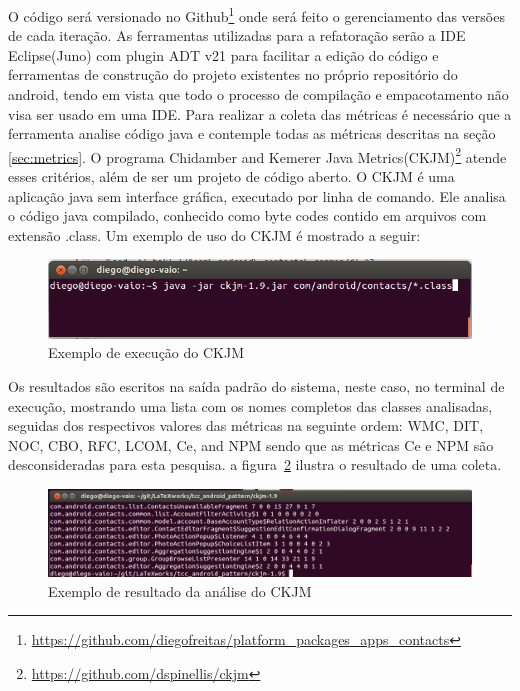 \documentclass[conference]{IEEEtran}
\begin{document}
O código será versionado no
Github\footnote{\url{https://github.com/diegofreitas/platform_packages_apps_contacts}}
onde será feito o gerenciamento das versões de cada iteração.
As ferramentas utilizadas para a refatoração serão a IDE Eclipse(Juno) com
plugin ADT v21 para facilitar a edição do código e ferramentas de construção
do projeto existentes no próprio repositório do android, tendo em vista que todo
o processo de compilação e empacotamento não visa ser usado em uma IDE.
Para realizar a coleta das métricas é necessário que a ferramenta analise código
java e contemple todas as métricas descritas na seção \ref{sec:metrics}. O
programa Chidamber and Kemerer Java
Metrics(CKJM)\footnote{\url{https://github.com/dspinellis/ckjm}} atende esses
critérios, além de ser um projeto de código aberto. O CKJM é uma aplicação java
sem interface gráfica, executado por linha de comando. Ele analisa o código java
compilado, conhecido como byte codes contido em arquivos com extensão .class. Um
exemplo de uso do CKJM é mostrado a seguir:

\begin{figure}[htb]
	\begin{center}
		\includegraphics[scale=0.25]{img/ckjm_run.png}
	\end{center}
	\caption{\label{fig:ckjm_run} Exemplo de execução do CKJM} 
	
\end{figure}

Os resultados são escritos na saída padrão do sistema, neste caso, no terminal
de execução, mostrando uma lista com os nomes completos das classes
analisadas, seguidas dos respectivos valores das métricas na seguinte
ordem: WMC, DIT, NOC, CBO, RFC, LCOM, Ce, and NPM sendo que as métricas Ce e
NPM são desconsideradas para esta pesquisa. a figura~\ref{fig:ckjm_result}
ilustra o resultado de uma coleta.

\begin{figure}[htb]
	\begin{center}
		\includegraphics[scale=0.25]{img/ckjm_result.png}
	\end{center}
	\caption{\label{fig:ckjm_result} Exemplo de resultado da análise do CKJM} 
	
\end{figure}
\end{document}
